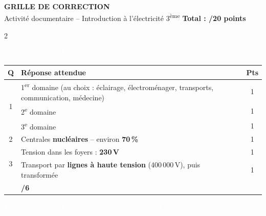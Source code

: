 \documentclass[10pt,a4paper,landscape]{article}
\newcommand{\exotitle}[2]{%
  \noindent\colorbox{exoheader}{%
    \parbox{\dimexpr\linewidth-2\fboxsep\relax}{%
      \textcolor{white}{\textbf{\large #1 \hfill #2}}%
    }%
  }%
}
\begin{document}
\begin{center}
  {\LARGE\textbf{GRILLE DE CORRECTION}}\\[1mm]
  {\large Activité documentaire -- Introduction à l'électricité \hspace{1cm} 3\textsuperscript{ème} \hspace{1cm} \textbf{Total : /20 points}}
\end{center}

\vspace{2mm}

\begin{multicols}{2}

\exotitle{Document 1 --- L'électricité dans notre quotidien}{/6 pts}

\vspace{1mm}

\begin{tabularx}{\linewidth}{|c|X|c|}
  \hline
  \rowcolor{exolight}
  \textbf{Q} & \textbf{Réponse attendue} & \textbf{Pts} \\
  \hline
  \multirow{3}{*}{1} & 1\textsuperscript{er} domaine (au choix : éclairage, électroménager, transports, communication, médecine) & 1 \\
  \cline{2-3}
  & 2\textsuperscript{e} domaine & 1 \\
  \cline{2-3}
  & 3\textsuperscript{e} domaine & 1 \\
  \hline
  2 & Centrales \textbf{nucléaires} -- environ \textbf{70\,\%} & 1 \\
  \hline
  \multirow{2}{*}{3} & Tension dans les foyers : \textbf{230\,V} & 1 \\
  \cline{2-3}
  & Transport par \textbf{lignes à haute tension} (400\,000\,V), puis transformée & 1 \\
  \hline
  \rowcolor{totalrow}
  \multicolumn{2}{|r|}{\textbf{Sous-total Document 1}} & \textbf{/6} \\
  \hline
\end{tabularx}

\vspace{4mm}

\exotitle{Document 2 --- Les composants d'un circuit}{/7 pts}

\vspace{1mm}


\end{multicols}
\end{document}
